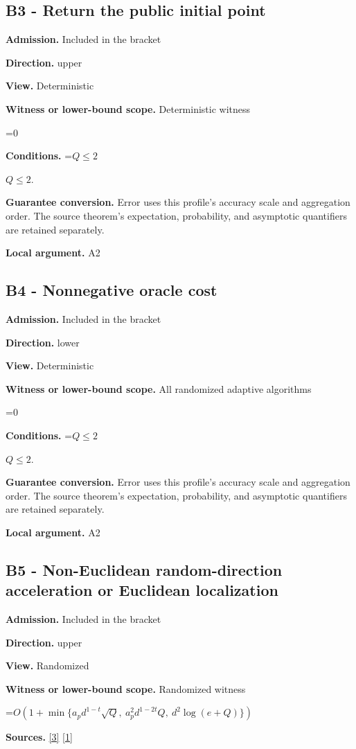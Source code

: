 \documentclass[10pt,a4paper]{article}
\newcommand{\AtlasMath}[1]{\par\begingroup\centering\setbox0=\hbox{$\displaystyle #1$}\ifdim\wd0>1.4\linewidth\typeout{ATLAS WIDE FORMULA: \the\wd0}\fi\ifdim\wd0>\linewidth\resizebox{\linewidth}{!}{\box0}\else\box0\fi\par\endgroup}
\newcommand{\AtlasInlineMath}[1]{\begingroup\setbox0=\hbox{$#1$}\ifdim\wd0>.4\linewidth\endgroup\AtlasMath{#1}\else\endgroup$#1$\fi}
\begin{document}
\subsection{B3 - Return the public initial point}
\textbf{Admission.} Included in the bracket

\textbf{Direction.} upper

\textbf{View.} Deterministic

\textbf{Witness or lower-bound scope.} Deterministic witness

\AtlasMath{0}
\textbf{Conditions.} \AtlasInlineMath{Q\le2}.

\textbf{Guarantee conversion.} Error uses this profile's accuracy scale and aggregation order. The source theorem's expectation, probability, and asymptotic quantifiers are retained separately.

\textbf{Local argument.} A2

\subsection{B4 - Nonnegative oracle cost}
\textbf{Admission.} Included in the bracket

\textbf{Direction.} lower

\textbf{View.} Deterministic

\textbf{Witness or lower-bound scope.} All randomized adaptive algorithms

\AtlasMath{0}
\textbf{Conditions.} \AtlasInlineMath{Q\le2}.

\textbf{Guarantee conversion.} Error uses this profile's accuracy scale and aggregation order. The source theorem's expectation, probability, and asymptotic quantifiers are retained separately.

\textbf{Local argument.} A2

\subsection{B5 - Non-Euclidean random-direction acceleration or Euclidean localization}
\textbf{Admission.} Included in the bracket

\textbf{Direction.} upper

\textbf{View.} Randomized

\textbf{Witness or lower-bound scope.} Randomized witness

\AtlasMath{O\!\left(1+\min\{a_p d^{1-t}\sqrt Q,\ a_p^2d^{1-2t}Q,\ d^2\log(e+Q)\}\right)}
\textbf{Sources.} \href{https://arxiv.org/abs/1802.09022}{[3]} \href{https://arxiv.org/html/2610.00345v1}{[1]}
\end{document}
